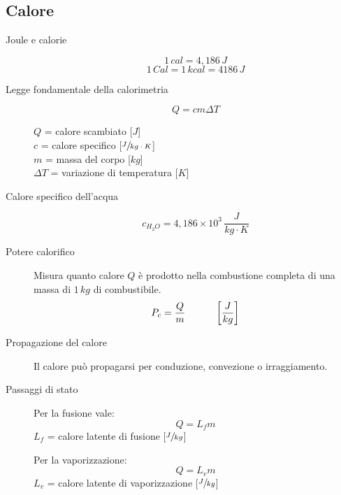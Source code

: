\documentclass[a4paper,11pt,italian]{article}
\begin{document}
\subsection{Calore}

\begin{description}
  \item[Joule e calorie] 
  \[ 1 \, cal = 4,186 \, J \] \[ 1 \, Cal = 1 \, kcal = 4186 \, J \]
  
  \item[Legge fondamentale della calorimetria]
  \[ Q = cm \Delta T \]
  \begin{multicols}{2}
  $ Q $ = calore scambiato [$ J $]\\
  $ c $ = calore specifico [$ \sfrac{J}{kg\cdot K} $]\\
  $ m $ = massa del corpo [$ kg $]\\
  $ \Delta T $ = variazione di temperatura [$ K $]
  \end{multicols}
  
  \item[Calore specifico dell'acqua] 
  \[ c_{H_2O} = 4,186 \times 10^3 \, \frac{J}{kg \cdot K}\]
  
  \item[Potere calorifico] 
  Misura quanto calore $ Q $ è prodotto nella combustione completa di una massa di $ 1 \, kg $ di combustibile.
  \[ P_c = \frac{Q}{m} \hspace*{3em} \left[ \frac{J}{kg} \right] \]
  
  \item[Propagazione del calore] 
  Il calore può propagarsi per conduzione, convezione o irraggiamento.

  
  \item[Passaggi di stato] 
  Per la fusione vale:
  \[ Q = L_f m \]
  $ L_f $ = calore latente di fusione [$ \sfrac{J}{kg} $]
  
  Per la vaporizzazione:
  \[ Q = L_v m \]
  $ L_v $ = calore latente di vaporizzazione [$ \sfrac{J}{kg} $]
\end{description}
\end{document}
